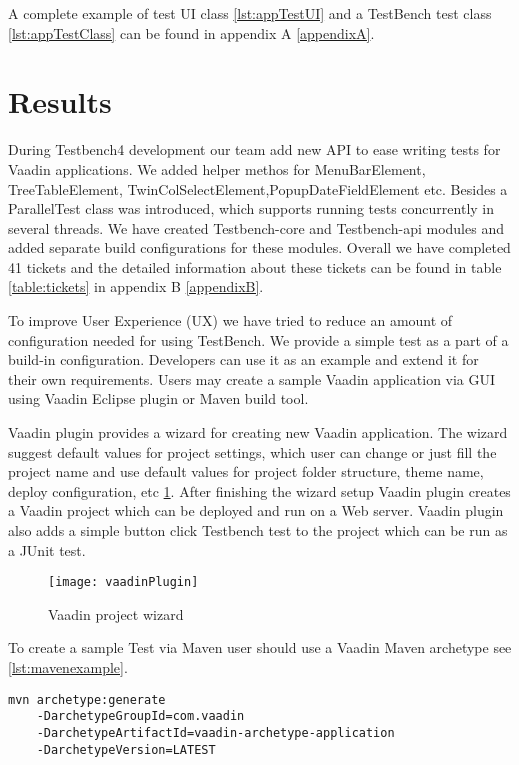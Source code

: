 A complete example of test UI class \ref{lst:appTestUI}  and a TestBench test
class \ref{lst:appTestClass} can be found in appendix A \ref{appendixA}.

\section {Results}
During Testbench4 development our team add new API to ease writing tests for
Vaadin applications. We added helper methos for MenuBarElement,
TreeTableElement, TwinColSelectElement,PopupDateFieldElement etc. Besides a
ParallelTest class was introduced, which supports running tests concurrently in
several threads. We have created Testbench-core and Testbench-api modules and
added separate build configurations for these modules. Overall we have completed
41 tickets and the detailed information about these tickets can be found in
table \ref{table:tickets} in appendix B \ref{appendixB}.

To improve User Experience (UX) we have tried to reduce an amount of
configuration needed for using TestBench. We provide a simple test as a
part of a build-in configuration.
Developers can use it as an example and extend it for their own requirements. Users may create a sample
Vaadin application via GUI using Vaadin Eclipse plugin or Maven build tool.

Vaadin plugin provides a wizard for creating new Vaadin application. The wizard
suggest default values for project settings, which user can change or just fill
the project name and use default values for project folder structure, theme
name, deploy configuration, etc \ref{fig:vaadinPlugin}. After finishing the
wizard setup Vaadin plugin creates a Vaadin project which can be
deployed and run on a Web server. Vaadin plugin also adds a simple button click
Testbench test to the project which can be run as a JUnit test.
  \begin{figure}
  \centering
  \texttt{[image: vaadinPlugin]}
  \caption{Vaadin project wizard}
  \label{fig:vaadinPlugin}
  \end{figure}

To create a sample Test via Maven user should use a Vaadin Maven
archetype see \ref{lst:mavenexample}.
\lstset{style=console}
\begin{lstlisting}[caption=Create Vaadin sample application command.,label={lst:mavenexample}]
mvn archetype:generate 
	-DarchetypeGroupId=com.vaadin
	-DarchetypeArtifactId=vaadin-archetype-application
	-DarchetypeVersion=LATEST
\end{lstlisting}

